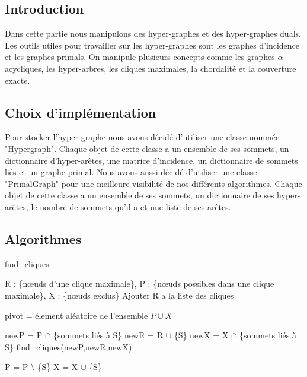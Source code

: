 \documentclass{article}
\begin{document}
	\subsection{Introduction}
	Dans cette partie nous manipulons des hyper-graphes et des hyper-graphes duals. Les outils utiles pour travailler sur les hyper-graphes sont les graphes d’incidence et les graphes primals. On manipule plusieurs concepts comme les graphes $\alpha$-acycliques, les hyper-arbres, les cliques maximales, la chordalité et la couverture exacte.
	
	\subsection{Choix d'implémentation}
	Pour stocker l'hyper-graphe nous avons décidé d'utiliser une classe nommée "Hypergraph". Chaque objet de cette classe a un ensemble de ses sommets, un dictionnaire d'hyper-arêtes, une matrice d'incidence, un dictionnaire de sommets liés et un graphe primal.
	Nous avons aussi décidé d'utiliser une classe "PrimalGraph" pour une meilleure visibilité de nos différents algorithmes. Chaque objet de cette classe a un ensemble de ses sommets, un dictionnaire de ses hyper-arêtes, le nombre de sommets qu'il a et une liste de ses arêtes.	
	
	\subsection{Algorithmes}
	
		\begin{algorithm}[H]
		\caption{find\_cliques}
		\begin{algorithmic}[1]
		\REQUIRE R : \{nœuds d'une clique maximale\}, P : \{nœuds possibles dans une clique maximale\}, X : \{nœuds exclus\}
		\STATE Ajouter R a la liste des cliques
		\ENDIF
		
		\ELSE
		
		\STATE pivot = élement aléatoire de l'ensemble $P \cup X $
		
		
		\STATE newP = P $\cap$ \{sommets liés à S\}
		\STATE newR = R $\cup$ \{S\}
		\STATE newX = X $\cap$ \{sommets liés à S\}
		\STATE find\_cliques(newP,newR,newX)
		
		\STATE P = P $\setminus$ \{S\}
		\STATE X = X $\cup$ \{S\}
		\ENDFOR		
		
		\ENDIF
	
	
		\end{algorithmic}
		\end{algorithm}
\end{document}
